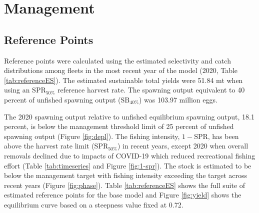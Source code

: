 \documentclass[11pt,
  english,
  a4paper,
]{article}
\begin{document}
\leavevmode\tagmcend\tagstructend\par


\hypertarget{management}{%
\section{Management}\label{management}}

\leavevmode\tagmcend\tagstructend


\hypertarget{reference-points}{%
\subsection{Reference Points}\label{reference-points}}

\leavevmode\tagmcend\tagstructend


Reference points were calculated using the estimated selectivity and catch distributions among fleets in the most recent year of the model (2020, Table \ref{tab:referenceES}). The estimated sustainable total yields were 51.84 mt when using an {\(\text{SPR}_{50\%}\)\leavevmode\tagmcend\tagstructend} reference harvest rate. The spawning output equivalent to 40 percent of unfished spawning output ({\(\text{SB}_{40\%}\)\leavevmode\tagmcend\tagstructend}) was 103.97 million eggs.

\leavevmode\tagmcend\tagstructend\par


The 2020 spawning output relative to unfished equilibrium spawning output, 18.1 percent, is below the management threshold limit of 25 percent of unfished spawning output (Figure \ref{fig:depl}). The fishing intensity, {\(1-\text{SPR}\)\leavevmode\tagmcend\tagstructend}, has been above the harvest rate limit ({\(\text{SPR}_{50\%}\)\leavevmode\tagmcend\tagstructend}) in recent years, except 2020 when overall removals declined due to impacts of COVID-19 which reduced recreational fishing effort (Table \ref{tab:timeseries} and Figure \ref{fig:1-spr}). The stock is estimated to be below the management target with fishing intensity exceeding the target across recent years (Figure \ref{fig:phase}). Table \ref{tab:referenceES} shows the full suite of estimated reference points for the base model and Figure \ref{fig:yield} shows the equilibrium curve based on a steepness value fixed at 0.72.
\end{document}

